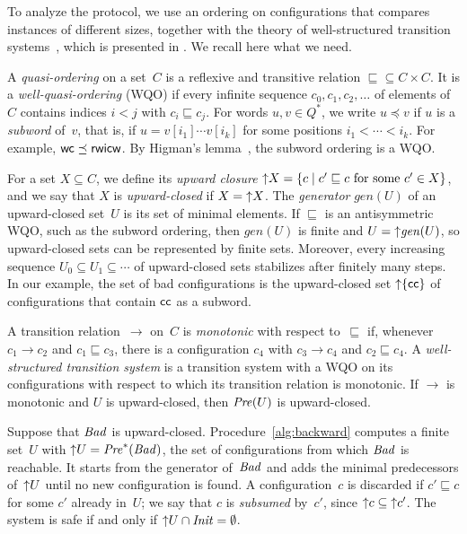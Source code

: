 To analyze the protocol, we use an ordering on configurations that compares
instances of different sizes, together with the theory of well-structured
transition systems~\cite{ACJT96,ACJT00,FS01}, which is presented in
. We recall here what we need.

A \emph{quasi-ordering} on a set~$C$ is a reflexive and transitive relation
${\sqsubseteq} \subseteq C \times C$. It is a \emph{well-quasi-ordering} (WQO)
if every infinite sequence $c_0, c_1, c_2, \ldots$ of elements of~$C$ contains
indices $i < j$ with $c_i \sqsubseteq c_j$. For words $u, v \in Q^*$, we write $u
\preceq v$ if $u$ is a \emph{subword} of~$v$, that is, if $u = v[i_1] \cdots
v[i_k]$ for some positions $i_1 < \cdots < i_k$. For example, $\mathsf{w}\mathsf{c}
\preceq \mathsf{r}\mathsf{w}\mathsf{i}\mathsf{c}\mathsf{w}$. By Higman's lemma~\cite{Hig52}, the subword
ordering is a WQO.

For a set $X \subseteq C$, we define its \emph{upward closure} ${\uparrow}X = \{ c
\mid c' \sqsubseteq c \text{ for some } c' \in X \}$, and we say that $X$ is
\emph{upward-closed} if $X = {\uparrow}X$. The \emph{generator}
$\mathit{gen}(U)$ of an upward-closed set~$U$ is its set of minimal elements.
If $\sqsubseteq$ is an antisymmetric WQO, such as the subword ordering, then
$\mathit{gen}(U)$ is finite and $U =
{\uparrow}\mathit{gen}(U)$, so upward-closed sets can be represented by finite
sets. Moreover, every increasing sequence $U_0 \subseteq U_1 \subseteq \cdots$
of upward-closed sets stabilizes after finitely many steps. In our example, the
set of bad configurations is the upward-closed set ${\uparrow}\{\mathsf{c}\mathsf{c}\}$ of
configurations that contain $\mathsf{c}\mathsf{c}$ as a subword.

A transition relation~$\to$ on~$C$ is \emph{monotonic} with respect
to~$\sqsubseteq$ if, whenever $c_1 \to c_2$ and $c_1 \sqsubseteq c_3$, there is
a configuration $c_4$ with $c_3 \to c_4$ and $c_2 \sqsubseteq c_4$. A
\emph{well-structured transition system} is a transition system with a WQO on
its configurations with respect to which its transition relation is
monotonic. If $\to$ is monotonic and $U$ is upward-closed, then $\mathit{Pre}(U)$ is
upward-closed.

Suppose that $\mathit{Bad}$ is upward-closed. Procedure~\ref{alg:backward} computes a
finite set~$U$ with ${\uparrow}U = \mathit{Pre}^*(\mathit{Bad})$, the set of configurations from
which $\mathit{Bad}$ is reachable. It starts from the generator of~$\mathit{Bad}$ and adds the
minimal predecessors of~${\uparrow}U$ until no new configuration is found. A
configuration~$c$ is discarded if $c' \sqsubseteq c$ for some $c'$ already
in~$U$; we say that $c$ is \emph{subsumed} by~$c'$, since ${\uparrow}c \subseteq
{\uparrow}c'$. The system is safe if and only if ${\uparrow}U \cap \mathit{Init} = \emptyset$.

